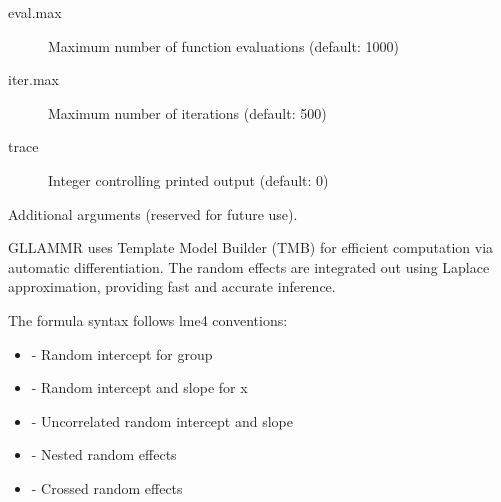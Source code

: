 \documentclass[a4paper]{book}
\begin{document}
\begin{Arguments}
\begin{ldescription}
\begin{description}
\item[eval.max] Maximum number of function evaluations (default: 1000)
\item[iter.max] Maximum number of iterations (default: 500)
\item[trace] Integer controlling printed output (default: 0)

\end{description}


\item[\code{...}] Additional arguments (reserved for future use).
\end{ldescription}
\end{Arguments}
%
\begin{Details}
GLLAMMR uses Template Model Builder (TMB) for efficient computation via
automatic differentiation. The random effects are integrated out using
Laplace approximation, providing fast and accurate inference.

The formula syntax follows lme4 conventions:
\begin{itemize}

\item{}  - Random intercept for group
\item{}  - Random intercept and slope for x
\item{}  - Uncorrelated random intercept and slope
\item{}  - Nested random effects
\item{}  - Crossed random effects

\end{itemize}

\end{Details}
%
\end{document}
